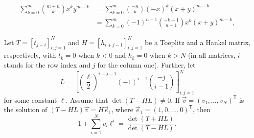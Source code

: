\documentclass[10pt,a4paper]{amsart}
\begin{document}
\begin{align}
    \label{bimonial identity}
    \sum_{k=0}^m\binom{m+n}k x^k y^{m-k} & = \sum_{k=0}^m \binom{-n}{k} (-x)^k(x+y)^{m-k} \\
    & = \sum_{k=0}^m (-1)^{n-1}\binom{-k-1}{n-1} x^k(x+y)^{m-k},
\end{align}

\begin{prop}
\label{prop:det}
Let \( T=[t_{j-i}]_{i,j=1}^N \) and \( H=[h_{i+j-1}]_{i,j=1}^N \) be a Toeplitz and a Hankel matrix, respectively, with \( t_k=0 \) when \( k<0 \) and \( h_k=0 \) when \( k>N \) (in all matrices, \( i \) stands for the row index and \( j \) for the column one). Further, let
\[
L = \left[\left(\frac\ell2\right)^{i+j-1}(-1)^{i-1}\binom{-j}{i-1}\right]_{i,j=1}^N
\]
for some constant \( \ell \). Assume that \( \det(T-HL)\neq 0 \). If \( \vec v=(v_1,\ldots,v_N)^\mathsf{T} \) is the solution of \( (T-HL)\vec v = H\vec e_1\), where \( \vec e_1 = (1,0,\ldots,0)^\mathsf{T} \), then
\[
1 + \sum_{i=1}^N v_i\ell^i = \frac{\det(T+HL)}{\det(T-HL)}.
\]
\end{prop}
\end{document}
